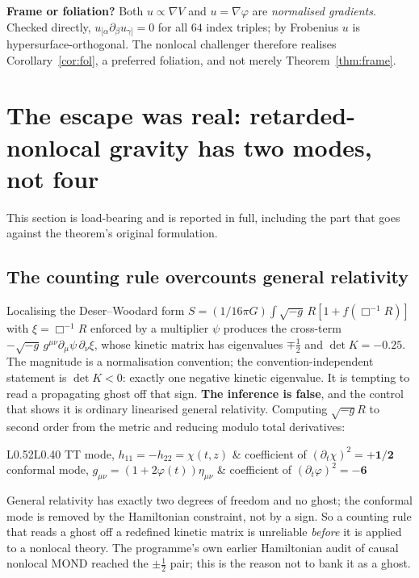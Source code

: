 \documentclass[11pt,letterpaper]{article}
\newcommand{\dal}{\Box}
\begin{document}
\textbf{Frame or foliation?} Both $u\propto\nabla V$ and $u=\nabla\varphi$ are \emph{normalised gradients}. Checked directly, $u_{[\alpha}\partial_\beta u_{\gamma]}=0$ for all $64$ index triples; by Frobenius $u$ is hypersurface-orthogonal. The nonlocal challenger therefore realises Corollary~\ref{cor:fol}, a preferred foliation, and not merely Theorem~\ref{thm:frame}.

\section{The escape was real: retarded-nonlocal gravity has two modes, not four}\label{sec:modes}

This section is load-bearing and is reported in full, including the part that goes against the theorem's original formulation.

\subsection{The counting rule overcounts general relativity}
Localising the Deser--Woodard form $S=(1/16\pi G)\int\sqrt{-g}\,R[1+f(\dal^{-1}R)]$ \cite{DeserWoodard2007,DeserWoodard2013} with $\xi=\dal^{-1}R$ enforced by a multiplier $\psi$ produces the cross-term $-\sqrt{-g}\,g^{\mu\nu}\partial_\mu\psi\,\partial_\nu\xi$, whose kinetic matrix has eigenvalues $\mp\tfrac12$ and $\det K=-0.25$. The magnitude is a normalisation convention; the convention-independent statement is $\det K<0$: exactly one negative kinetic eigenvalue. It is tempting to read a propagating ghost off that sign. \textbf{The inference is false}, and the control that shows it is ordinary linearised general relativity. Computing $\sqrt{-g}R$ to second order from the metric and reducing modulo total derivatives:
\begin{center}\small
\begin{tabular}{L{0.52\textwidth}L{0.40\textwidth}}\toprule
TT mode, $h_{11}=-h_{22}=\chi(t,z)$ & coefficient of $(\partial_t\chi)^2=\mathbf{+1/2}$\\
conformal mode, $g_{\mu\nu}=(1+2\varphi(t))\eta_{\mu\nu}$ & coefficient of $(\partial_t\varphi)^2=\mathbf{-6}$\\\bottomrule
\end{tabular}
\end{center}
General relativity has exactly two degrees of freedom and no ghost; the conformal mode is removed by the Hamiltonian constraint, not by a sign. So a counting rule that reads a ghost off a redefined kinetic matrix is unreliable \emph{before} it is applied to a nonlocal theory. The programme's own earlier Hamiltonian audit of causal nonlocal MOND \cite{Zimmerman2026carrier} reached the $\pm\tfrac12$ pair; this is the reason not to bank it as a ghost.
\end{document}

